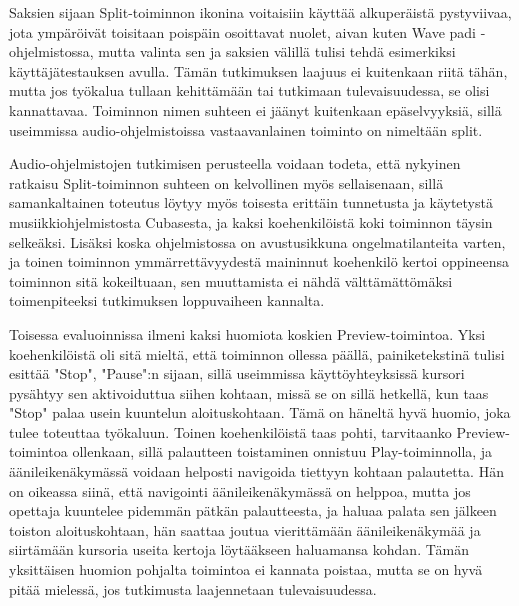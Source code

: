 \documentclass[utf8]{gradu3}
\begin{document}
Saksien sijaan Split-toiminnon ikonina voitaisiin käyttää alkuperäistä pystyviivaa, jota ympäröivät toisitaan poispäin osoittavat nuolet, aivan kuten Wave padi -ohjelmistossa, mutta valinta sen ja saksien välillä tulisi tehdä esimerkiksi käyttäjätestauksen avulla. Tämän tutkimuksen laajuus ei kuitenkaan riitä tähän, mutta jos työkalua tullaan kehittämään tai tutkimaan tulevaisuudessa, se olisi kannattavaa. Toiminnon nimen suhteen ei jäänyt kuitenkaan epäselvyyksiä, sillä useimmissa audio-ohjelmistoissa vastaavanlainen toiminto on nimeltään split.

Audio-ohjelmistojen tutkimisen perusteella voidaan todeta, että nykyinen ratkaisu Split-toiminnon suhteen on kelvollinen myös sellaisenaan, sillä samankaltainen toteutus löytyy myös toisesta erittäin tunnetusta ja käytetystä musiikkiohjelmistosta Cubasesta, ja kaksi koehenkilöistä koki toiminnon täysin selkeäksi. Lisäksi koska ohjelmistossa on avustusikkuna ongelmatilanteita varten, ja toinen toiminnon ymmärrettävyydestä maininnut koehenkilö kertoi oppineensa toiminnon sitä kokeiltuaan, sen muuttamista ei nähdä välttämättömäksi toimenpiteeksi tutkimuksen loppuvaiheen kannalta. 

Toisessa evaluoinnissa ilmeni kaksi huomiota koskien Preview-toimintoa. Yksi koehenkilöistä oli sitä mieltä, että toiminnon ollessa päällä, painiketekstinä tulisi esittää "Stop", "Pause":n sijaan, sillä useimmissa käyttöyhteyksissä kursori pysähtyy sen aktivoiduttua siihen kohtaan, missä se on sillä hetkellä, kun taas "Stop" palaa usein kuuntelun aloituskohtaan. Tämä on häneltä hyvä huomio, joka tulee toteuttaa työkaluun. Toinen koehenkilöistä taas pohti, tarvitaanko Preview-toimintoa ollenkaan, sillä palautteen toistaminen onnistuu Play-toiminnolla, ja äänileikenäkymässä voidaan helposti navigoida tiettyyn kohtaan palautetta. Hän on oikeassa siinä, että navigointi äänileikenäkymässä on helppoa, mutta jos opettaja kuuntelee pidemmän pätkän palautteesta, ja haluaa palata sen jälkeen toiston aloituskohtaan, hän saattaa joutua vierittämään äänileikenäkymää ja siirtämään kursoria useita kertoja löytääkseen haluamansa kohdan. Tämän yksittäisen huomion pohjalta toimintoa ei kannata poistaa, mutta se on hyvä pitää mielessä, jos tutkimusta laajennetaan tulevaisuudessa.
\end{document}
